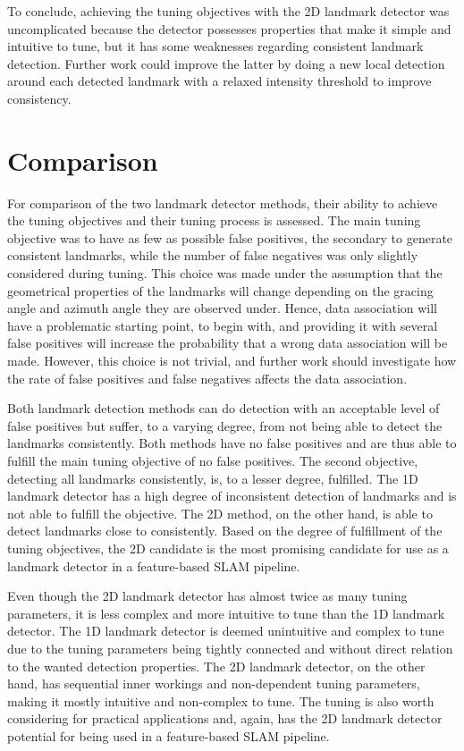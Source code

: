 To conclude, achieving the tuning objectives with the 2D landmark detector was uncomplicated because the detector possesses properties that make it simple and intuitive to tune, but it has some weaknesses regarding consistent landmark detection. Further work could improve the latter by doing a new local detection around each detected landmark with a relaxed intensity threshold to improve consistency.

\section{Comparison}

For comparison of the two landmark detector methods, their ability to achieve the tuning objectives and their tuning process is assessed. The main tuning objective was to have as few as possible false positives, the secondary to generate consistent landmarks, while the number of false negatives was only slightly considered during tuning. This choice was made under the assumption that the geometrical properties of the landmarks will change depending on the gracing angle and azimuth angle they are observed under. Hence, data association will have a problematic starting point, to begin with, and providing it with several false positives will increase the probability that a wrong data association will be made. However, this choice is not trivial, and further work should investigate how the rate of false positives and false negatives affects the data association.

Both landmark detection methods can do detection with an acceptable level of false positives but suffer, to a varying degree, from not being able to detect the landmarks consistently. Both methods have no false positives and are thus able to fulfill the main tuning objective of no false positives. The second objective, detecting all landmarks consistently, is, to a lesser degree, fulfilled. The 1D landmark detector has a high degree of inconsistent detection of landmarks and is not able to fulfill the objective. The 2D method, on the other hand, is able to detect landmarks close to consistently. Based on the degree of fulfillment of the tuning objectives, the 2D candidate is the most promising candidate for use as a landmark detector in a feature-based SLAM pipeline. 

Even though the 2D landmark detector has almost twice as many tuning parameters, it is less complex and more intuitive to tune than the 1D landmark detector. The 1D landmark detector is deemed unintuitive and complex to tune due to the tuning parameters being tightly connected and without direct relation to the wanted detection properties. The 2D landmark detector, on the other hand, has sequential inner workings and non-dependent tuning parameters, making it mostly intuitive and non-complex to tune. The tuning is also worth considering for practical applications and, again, has the 2D landmark detector potential for being used in a feature-based SLAM pipeline. 

